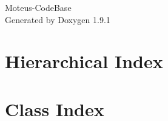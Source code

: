 \let\mypdfximage\pdfximage\def\pdfximage{\immediate\mypdfximage}\documentclass[twoside]{book}
\newcommand{\+}{\discretionary{\mbox{\scriptsize$\hookleftarrow$}}{}{}}
\newcommand{\clearemptydoublepage}{%
  \newpage{\pagestyle{empty}\cleardoublepage}%
}
\begin{document}
\raggedbottom

\hypersetup{pageanchor=false,
             bookmarksnumbered=true,
             pdfencoding=unicode
            }
\begin{titlepage}
\vspace*{7cm}
\begin{center}%
{\Large Moteus-\/\+Code\+Base }\\
\vspace*{1cm}
{\large Generated by Doxygen 1.9.1}\\
\end{center}
\end{titlepage}
\clearemptydoublepage
{}
\tableofcontents
\clearemptydoublepage
{}
\hypersetup{pageanchor=true}

\chapter{Hierarchical Index}

\chapter{Class Index}

\end{document}
